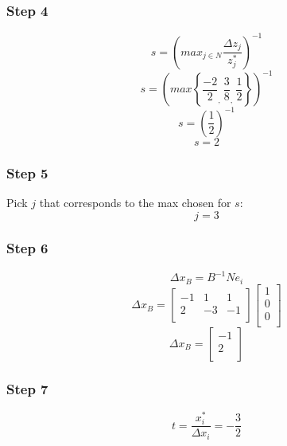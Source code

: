 \documentclass[14pt]{extarticle}
\begin{document}
\subsubsection*{Step 4}
\[
    s = \left(max_{j \in N} \frac{\Delta z_j}{z^*_j}\right)^{-1}
\]
\[
    s = \left(max \left\{ \frac{-2}{2}_{\textstyle,}\ \frac{3}{8}_{\textstyle,}\ \frac{1}{2} \right\} \right)^{-1}
\]
\[
    s = \left(\frac{1}{2}\right)^{-1}
\]
\[
    s = 2
\]

\subsubsection*{Step 5}
Pick $j$ that corresponds to the max chosen for $s$:
\[
    j = 3
\]

\subsubsection*{Step 6}
\[
    \Delta x_B = B^{-1}N e_i
\]
\[
    \Delta x_B =
    \begin{bmatrix}
        -1 & 1 & 1 \\
        2 & -3 & -1 \\
    \end{bmatrix}
    \begin{bmatrix}
        1 \\
        0 \\
        0 \\
    \end{bmatrix}
\]
\[
    \Delta x_B =
    \begin{bmatrix}
        -1 \\
        2 \\
    \end{bmatrix}
\]

\subsubsection*{Step 7}
\[
    t = \frac{x^*_i}{\Delta x_i} = -\frac{3}{2}
\]
\end{document}
